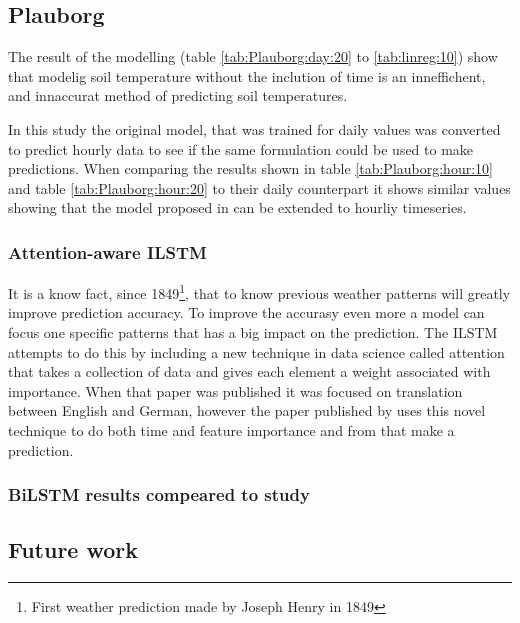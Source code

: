 \subsection{Plauborg}

The result of the modelling (table \ref{tab:Plauborg:day:20} to \ref{tab:linreg:10}) show that modelig soil temperature without the inclution of time is an inneffichent, and innaccurat method of predicting soil temperatures.
 
In this study the original model, that was trained for daily values was converted to predict hourly data to see if the same formulation could be used to make predictions. When comparing the results shown in table \ref{tab:Plauborg:hour:10} and table \ref{tab:Plauborg:hour:20} to their daily counterpart it shows similar values showing that the model proposed in \citeauthor{plauborg_simple_2002} can be extended to hourliy timeseries.
 
\subsubsection{Attention-aware ILSTM}
 
It is a know fact, since 1849\footnote{First weather prediction made by Joseph Henry in 1849}, that to know previous weather patterns will greatly improve prediction accuracy. To improve the accurasy even more a model can focus one specific patterns that has a big impact on the prediction. The ILSTM attempts to do this by including a new technique in data science called attention\cite{vaswani_attention_2017} that takes a collection of data and gives each element a weight associated with importance. When that paper was published it was focused on translation between English and German, however the paper published by \citeauthor{li_attention-aware_2022} uses this novel technique to do both time and feature importance and from that make a prediction.
 
\subsubsection{BiLSTM results compeared to \citeauthor{li_modeling_2020} study}
 
 
\subsection{Future work}

